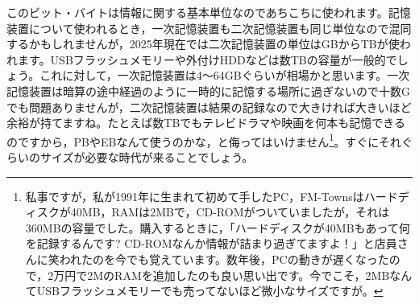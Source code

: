 \documentclass{ltjsbook}
\begin{document}
このビット・バイトは情報に関する基本単位なのであちこちに使われます。記憶装置について使われるとき，一次記憶装置も二次記憶装置も同じ単位なので混同するかもしれませんが，2025年現在では二次記憶装置の単位はGBからTBが使われます。USBフラッシュメモリーや外付けHDDなどは数TBの容量が一般的でしょう。これに対して，一次記憶装置は4〜64GBぐらいが相場かと思います。一次記憶装置は暗算の途中経過のように一時的に記憶する場所に過ぎないので十数Gでも問題ありませんが，二次記憶装置は結果の記録なので大きければ大きいほど余裕が持てますね。たとえば数TBでもテレビドラマや映画を何本も記憶できるのですから，PBやEBなんて使うのかな，と侮ってはいけません\footnote{私事ですが，私が1991年に生まれて初めて手したPC，FM-Townsはハードディスクが40MB，RAMは2MBで，CD-ROMがついていましたが，それは360MBの容量でした。購入するときに，「ハードディスクが40MBもあって何を記録するんです? CD-ROMなんか情報が詰まり過ぎてますよ！」と店員さんに笑われたのを今でも覚えています。数年後，PCの動きが遅くなったので，2万円で2MのRAMを追加したのも良い思い出です。今でこそ，2MBなんてUSBフラッシュメモリーでも売ってないほど微小なサイズですが。}。すぐにそれぐらいのサイズが必要な時代が来ることでしょう。
\end{document}
